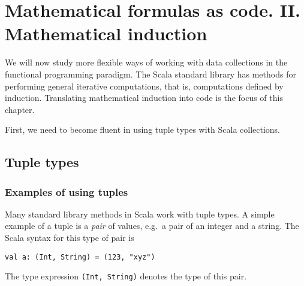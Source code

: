 
\chapter{Mathematical formulas as code. II. Mathematical induction\label{chap:2-Mathematical-induction}}

We will now study more flexible ways of working with data collections
in the functional programming paradigm. The Scala standard library
has methods for performing general iterative computations, that is,
computations defined by induction. Translating mathematical induction
into code is the focus of this chapter.

First, we need to become fluent in using tuple types with Scala collections.

\section{Tuple types}

\subsection{Examples of using tuples}

Many standard library methods in Scala work with tuple
types. A simple example of a tuple is a \emph{pair} of values, \textemdash{}
e.g.~a pair of an integer and a string. The Scala syntax for this
type of pair is
\begin{lstlisting}
val a: (Int, String) = (123, "xyz")
\end{lstlisting}
The type expression \lstinline!(Int, String)! denotes the type of
this pair.

